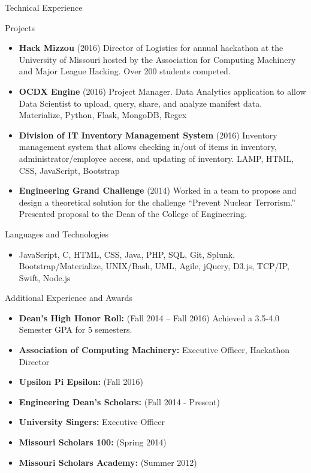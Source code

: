\documentclass[]{mcdowellcv}
\begin{document}
	\begin{cvsection}{Technical Experience}
		\begin{cvsubsection}{Projects}{}{}
			\begin{itemize}
				\item \textbf{Hack Mizzou} (2016) Director of Logistics for annual hackathon at the University of Missouri hosted by the Association for Computing Machinery and Major League Hacking. Over 200 students competed.
				\item \textbf{OCDX Engine} (2016) Project Manager. Data Analytics application to allow Data Scientist to upload, query, share, and analyze manifest data. Materialize, Python, Flask, MongoDB, Regex
				\item \textbf{Division of IT Inventory Management System} (2016) Inventory management system that allows checking in/out of items in inventory, administrator/employee access, and updating of inventory. LAMP, HTML, CSS, JavaScript, Bootstrap
				\item \textbf{Engineering Grand Challenge} (2014) Worked in a team to propose and design a theoretical solution for the challenge “Prevent Nuclear Terrorism.” Presented proposal to the Dean of the College of Engineering.
			\end{itemize}
		\end{cvsubsection}
      \begin{cvsubsection}{Languages and Technologies}{}{}
      \begin{itemize}
				\item JavaScript, C, HTML, CSS,  Java, PHP, SQL, Git, Splunk, Bootstrap/Materialize, UNIX/Bash, UML, Agile, jQuery, D3.js, TCP/IP, Swift, Node.js
			\end{itemize}
        \end{cvsubsection}
	\end{cvsection}
	
	\begin{cvsection}{Additional Experience and Awards}
		\begin{cvsubsection}{}{}{}	
			\begin{itemize}
				\item \textbf{Dean’s High Honor Roll:}  (Fall 2014 – Fall 2016) Achieved a 3.5-4.0 Semester GPA for 5 semesters.
                \item \textbf{Association of Computing Machinery:} Executive Officer, Hackathon Director
		\item \textbf{Upsilon Pi Epsilon:}  (Fall 2016)
                \item \textbf{Engineering Dean’s Scholars:} (Fall 2014 - Present)
                \item \textbf{University Singers:} Executive Officer
                \item \textbf{Missouri Scholars 100:} (Spring 2014)
                \item \textbf{Missouri Scholars Academy:} (Summer 2012)
			\end{itemize}
		\end{cvsubsection}
	\end{cvsection}
\end{document}
